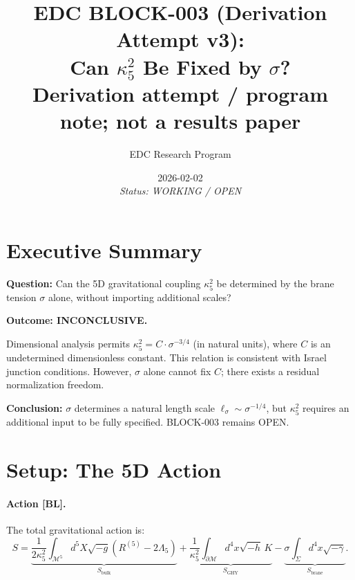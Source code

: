 \documentclass[11pt,a4paper]{article}
\title{\textbf{EDC BLOCK-003 (Derivation Attempt v3):}\\[0.3em]
Can $\kappa_5^2$ Be Fixed by $\sigma$?\\[0.5em]
\large Derivation attempt / program note; not a results paper}
\author{EDC Research Program}
\date{2026-02-02\\[0.3em]\small\textit{Status: WORKING / OPEN}}
\newcommand{\tagBL}{\textcolor{blue!70!black}{[BL]}}
\begin{document}
\maketitle

\section{Executive Summary}
\label{sec:summary}

\begin{statusbox}
\textbf{Question:} Can the 5D gravitational coupling $\kappa_5^2$ be determined by the brane tension $\sigma$ alone, without importing additional scales?

\textbf{Outcome: INCONCLUSIVE.}

Dimensional analysis permits $\kappa_5^2 = C \cdot \sigma^{-3/4}$ (in natural units), where $C$ is an undetermined dimensionless constant.
This relation is consistent with Israel junction conditions.
However, $\sigma$ alone cannot fix $C$; there exists a residual normalization freedom.

\textbf{Conclusion:} $\sigma$ determines a natural length scale $\ell_\sigma \sim \sigma^{-1/4}$, but $\kappa_5^2$ requires an additional input to be fully specified.
BLOCK-003 remains OPEN.
\end{statusbox}

\section{Setup: The 5D Action}
\label{sec:setup}

\paragraph{Action \tagBL{}.}
The total gravitational action is:
\begin{equation}
    S = \underbrace{\frac{1}{2\kappa_5^2} \int_{\mathcal{M}^5} d^5X \sqrt{-g} \left( R^{(5)} - 2\Lambda_5 \right)}_{S_{\text{bulk}}}
    + \underbrace{\frac{1}{\kappa_5^2} \int_{\partial\mathcal{M}} d^4x \sqrt{-h} \, K}_{S_{\text{GHY}}}
    - \underbrace{\sigma \int_\Sigma d^4x \sqrt{-\gamma}}_{S_{\text{brane}}}.
    \label{eq:action}
\end{equation}
\end{document}
